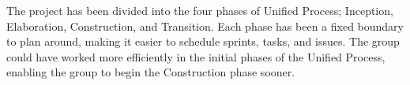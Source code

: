 The project has been divided into the four phases of Unified Process; Inception,
Elaboration, Construction, and Transition. Each phase has been a fixed boundary
to plan around, making it easier to schedule sprints, tasks, and issues. The
group could have worked more efficiently in the initial phases of the Unified
Process, enabling the group to begin the Construction phase sooner.
